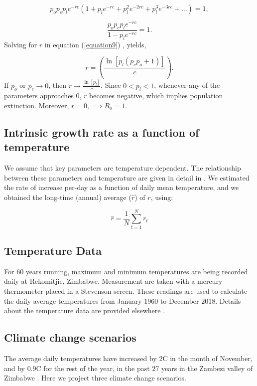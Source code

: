 \documentclass[10pt,a4paper]{article}
\begin{document}
$$p_op_cp_le^{-rc} (1 + p_le^{-rc} + p_l^2e^{-2rc} + p_l^3e^{-3rc}+ ...) =1,$$

\begin{equation}
\label{equation9} 
\frac{p_op_cp_le^{-rc}}{1-p_le^{-rc}} =1.
\end{equation}
Solving for $r$ in equation (\ref{equation9}) , yields, 

\begin{equation}
\label{equation13} 
r = (\frac{\ln[p_l(p_cp_o+1)]}{c}).
\end{equation}
If  $p_o$ or $p_c \rightarrow{0}$, then  $r \rightarrow{\frac{\ln[p_l]}{c}}$. Since $0 < p_l < 1$, whenever any of the parameters approaches $0$, $r$ becomes negative, which implies  population extinction. Moreover, $r = 0, \implies R_o = 1$.  


\subsection*{Intrinsic growth rate as a function of temperature}

We assume that key parameters are temperature dependent. The relationship between these parameters and temperature are given in detail in \cite{Are2019}. We estimated the rate of increase per-day as a function of daily mean temperature, and we obtained the long-time (annual) average ($\hat{r}$)  of $r$, using: 

\begin{equation}
\label{equation1010} 
\hat{r} = \frac{1}{N} \sum_{t=1}^{N} r_t
\end{equation}

\subsection*{Temperature Data}
For 60 years running, maximum and minimum temperatures are being recorded daily at Rekomitjie, Zimbabwe. Measurement are taken with a mercury thermometer placed in a Stevenson screen.  These readings are used to calculate the daily average temperatures from January 1960 to December 2018. Details about the temperature data are provided elsewhere \cite{Lord2018}.   

\subsection*{Climate change scenarios}

The average daily temperatures have increased by 2\degree C in the month of November, and by 0.9\degree C for the rest of the year, in the past 27 years in the Zambezi valley of Zimbabwe \cite{Lord2018}. Here we project three climate change scenarios.
\end{document}
